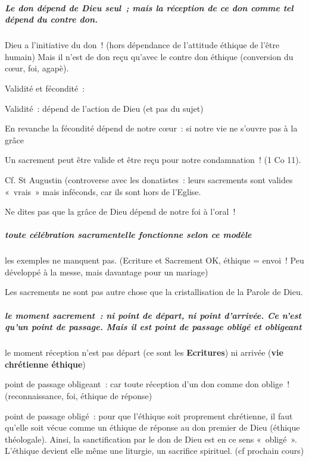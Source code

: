 \hypertarget{b.-le-don-duxe9pend-de-dieu-seul-mais-la-ruxe9ception-de-ce-don-comme-tel-duxe9pend-du-contre-don.}{%
\subparagraph{Le don dépend de Dieu seul~; mais la réception de ce don
comme tel dépend du contre
don.}\label{b.-le-don-duxe9pend-de-dieu-seul-mais-la-ruxe9ception-de-ce-don-comme-tel-duxe9pend-du-contre-don.}}

Dieu a l'initiative du don~! (hors dépendance de l'attitude éthique de
l'être humain) Mais il n'est de don reçu qu'avec le contre don éthique
(conversion du cœur, foi, agapè).

Validité et fécondité~:

Validité~: dépend de l'action de Dieu (et pas du sujet)

En revanche la fécondité dépend de notre cœur~: si notre vie ne s'ouvre
pas à la grâce

Un sacrement peut être valide et être reçu pour notre condamnation~! (1
Co 11).

Cf. St Augustin (controverse avec les donatistes~: leurs sacrements sont
valides «~vrais~» mais inféconds, car ils sont hors de l'Eglise.

Ne dites pas que la grâce de Dieu dépend de notre foi à l'oral~!

\hypertarget{c.-toute-cuxe9luxe9bration-sacramentelle-fonctionne-selon-ce-moduxe8le}{%
\subparagraph{toute célébration sacramentelle fonctionne selon ce
modèle}\label{c.-toute-cuxe9luxe9bration-sacramentelle-fonctionne-selon-ce-moduxe8le}}

les exemples ne manquent pas. (Ecriture et Sacrement OK, éthique =
envoi~! Peu développé à la messe, mais davantage pour un mariage)

Les sacrements ne sont pas autre chose que la cristallisation de la
Parole de Dieu.

\subparagraph{le moment sacrement~: ni point de départ,
ni point d'arrivée. Ce n'est qu'un point de passage. Mais il
{est} point de passage obligé et
obligeant} 

le moment réception n'est pas départ (ce sont les \textbf{Ecritures}) ni
arrivée (\textbf{vie chrétienne éthique})

point de passage obligeant~: car toute réception d'un don comme don
oblige~! (reconnaissance, foi, éthique de réponse)

point de passage obligé~: pour que l'éthique soit proprement chrétienne,
il faut qu'elle soit vécue comme un éthique de réponse au don premier de
Dieu (éthique théologale). Ainsi, la sanctification par le don de Dieu
est en ce sens «~obligé~». L'éthique devient elle même une liturgie, un
sacrifice spirituel. (cf prochain cours)

